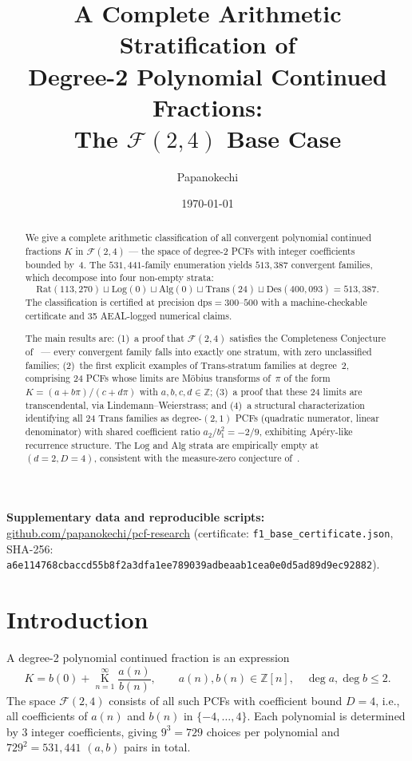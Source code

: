\documentclass[12pt, reqno]{amsart}
\title{A Complete Arithmetic Stratification of\\
  Degree-2 Polynomial Continued Fractions:\\
  The $\mathcal{F}(2,4)$ Base Case}
\author{Papanokechi}
\date{\today}
\theoremstyle{definition}
\theoremstyle{remark}
\newcommand{\Rat}{\mathrm{Rat}}
\newcommand{\Log}{\mathrm{Log}}
\newcommand{\Alg}{\mathrm{Alg}}
\newcommand{\Trans}{\mathrm{Trans}}
\newcommand{\Des}{\mathrm{Des}}
\begin{document}
\begin{abstract}
We give a complete arithmetic classification of all convergent polynomial continued
fractions $K$ in $\mathcal{F}(2,4)$ --- the space of degree-2 PCFs with integer coefficients
bounded by~4. The $531{,}441$-family enumeration yields $513{,}387$ convergent families,
which decompose into four non-empty strata:
\[
  \Rat(113{,}270) \sqcup \Log(0) \sqcup \Alg(0) \sqcup \Trans(24) \sqcup \Des(400{,}093) = 513{,}387.
\]
The classification is certified at precision $\mathrm{dps}=300$--$500$ with a machine-checkable
certificate and 35 AEAL-logged numerical claims.

The main results are: (1)~a proof that $\mathcal{F}(2,4)$ satisfies the Completeness
Conjecture of~\cite{logladder} --- every convergent family falls into exactly one
stratum, with zero unclassified families; (2)~the first explicit examples of $\Trans$-stratum
families at degree~2, comprising 24 PCFs whose limits are M\"obius transforms
of~$\pi$ of the form $K = (a + b\pi)/(c + d\pi)$ with $a,b,c,d \in \mathbb{Z}$; (3)~a proof that these
24 limits are transcendental, via Lindemann--Weierstrass; and (4)~a structural
characterization identifying all 24 $\Trans$ families as degree-$(2,1)$ PCFs (quadratic
numerator, linear denominator) with shared coefficient ratio $a_2/b_1^2 = -2/9$,
exhibiting Ap\'ery-like recurrence structure. The $\Log$ and $\Alg$ strata are empirically
empty at $(d{=}2, D{=}4)$, consistent with the measure-zero conjecture of~\cite{logladder}.
\end{abstract}

\maketitle

\textbf{Supplementary data and reproducible scripts:}
\url{github.com/papanokechi/pcf-research} (certificate: \texttt{f1\_base\_certificate.json},
SHA-256: \texttt{a6e114768cbaccd55b8f2a3dfa1ee789039adbeaab1cea0e0d5ad89d9ec92882}).


\section{Introduction}

A degree-2 polynomial continued fraction is an expression
\[
  K = b(0) + \mathop{K}\limits_{n=1}^{\infty} \frac{a(n)}{b(n)},
  \qquad a(n), b(n) \in \mathbb{Z}[n],\quad \deg a, \deg b \le 2.
\]
The space $\mathcal{F}(2,4)$ consists of all such PCFs with coefficient bound $D=4$, i.e.,
all coefficients of $a(n)$ and $b(n)$ in $\{-4,\dots,4\}$. Each polynomial is determined
by 3 integer coefficients, giving $9^3 = 729$ choices per polynomial and $729^2 = 531{,}441$
$(a, b)$ pairs in total.
\end{document}
